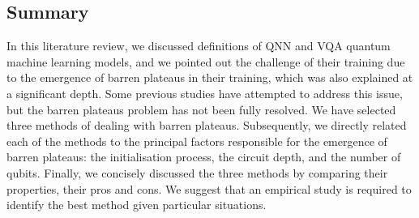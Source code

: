 \subsection{Summary}
In this literature review, we discussed definitions of QNN and VQA quantum machine learning models, and we pointed out the challenge of their training due to the emergence of barren plateaus in their training, which was also explained at a significant depth.
Some previous studies have attempted to address this issue, but the barren plateaus problem has not been fully resolved.
We have selected three methods of dealing with barren plateaus.
Subsequently, we directly related each of the methods to the principal factors responsible for the emergence of barren plateaus: the initialisation process, the circuit depth, and the number of qubits.
Finally, we concisely discussed the three methods by comparing their properties, their pros and cons.
We suggest that an empirical study is required to identify the best method given particular situations.